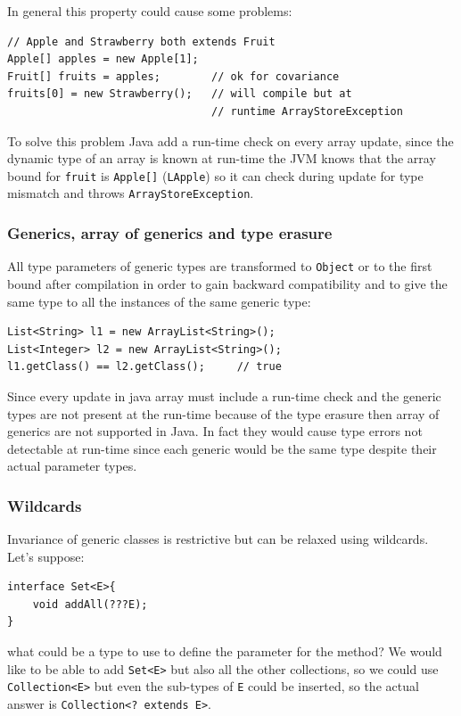 In general this property could cause some problems:
\begin{verbatim}
// Apple and Strawberry both extends Fruit
Apple[] apples = new Apple[1];
Fruit[] fruits = apples;        // ok for covariance
fruits[0] = new Strawberry();   // will compile but at
                                // runtime ArrayStoreException
\end{verbatim}

To solve this problem Java add a run-time check on every array update, since the dynamic type of an array is known at run-time the JVM knows that the array bound for \verb|fruit| is \verb|Apple[]| (\verb|LApple|) so it can check during update for type mismatch and throws \verb|ArrayStoreException|.

\subsubsection{Generics, array of generics and type erasure}
All type parameters of generic types are transformed to \verb|Object| or to the first bound after compilation in order to gain backward compatibility and to give the same type to all the instances of the same generic type:
\begin{verbatim}
List<String> l1 = new ArrayList<String>();
List<Integer> l2 = new ArrayList<String>();
l1.getClass() == l2.getClass();     // true
\end{verbatim}

Since every update in java array must include a run-time check and the generic types are not present at the run-time because of the type erasure then array of generics are not supported in Java.
In fact they would cause type errors not detectable at run-time since each generic would be the same type despite their actual parameter types.

\subsubsection{Wildcards}
Invariance of generic classes is restrictive but can be relaxed using wildcards.
Let's suppose:
\begin{verbatim}
interface Set<E>{
    void addAll(???E);
}
\end{verbatim}
what could be a type to use to define the parameter for the method?
We would like to be able to add \verb|Set<E>| but also all the other collections, so we could use \verb|Collection<E>| but even the sub-types of \verb|E| could be inserted, so the actual answer is \verb|Collection<? extends E>|.

